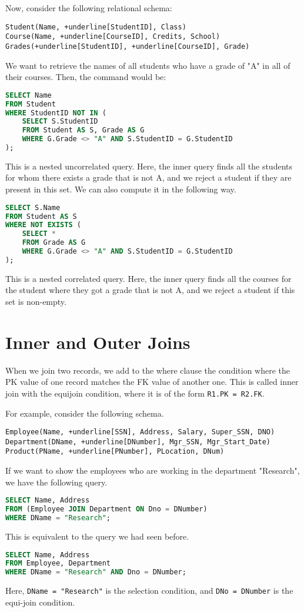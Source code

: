\documentclass[a4paper, openany]{memoir}
\begin{document}
Now, consider the following relational schema:
\begin{Verbatim}[commandchars=+\[\]]
Student(Name, +underline[StudentID], Class)
Course(Name, +underline[CourseID], Credits, School)
Grades(+underline[StudentID], +underline[CourseID], Grade)
\end{Verbatim}
We want to retrieve the names of all students who have a grade of "A" in all of their courses. Then, the command would be:
\begin{lstlisting}[language=SQL]
SELECT Name
FROM Student
WHERE StudentID NOT IN (
    SELECT S.StudentID
    FROM Student AS S, Grade AS G
    WHERE G.Grade <> "A" AND S.StudentID = G.StudentID
);
\end{lstlisting}
This is a nested uncorrelated query. Here, the inner query finds all the students for whom there exists a grade that is not A, and we reject a student if they are present in this set. We can also compute it in the following way.
\begin{lstlisting}[language=SQL]
SELECT S.Name
FROM Student AS S
WHERE NOT EXISTS (
    SELECT *
    FROM Grade AS G
    WHERE G.Grade <> "A" AND S.StudentID = G.StudentID
);
\end{lstlisting}
This is a nested correlated query. Here, the inner query finds all the courses for the student where they got a grade that is not A, and we reject a student if this set is non-empty.

\newpage

\section{Inner and Outer Joins}
When we join two records, we add to the where clause the condition where the PK value of one record matches the FK value of another one. This is called inner join with the equijoin condition, where it is of the form \texttt{R1.PK = R2.FK}. 

For example, consider the following schema.
\begin{Verbatim}[commandchars=+\[\]]
Employee(Name, +underline[SSN], Address, Salary, Super_SSN, DNO)
Department(DName, +underline[DNumber], Mgr_SSN, Mgr_Start_Date)
Product(PName, +underline[PNumber], PLocation, DNum)
\end{Verbatim}
If we want to show the employees who are working in the department "Research", we have the following query.
\begin{lstlisting}[language=SQL]
SELECT Name, Address
FROM (Employee JOIN Department ON Dno = DNumber)
WHERE DName = "Research";
\end{lstlisting}
This is equivalent to the query we had seen before.
\begin{lstlisting}[language=SQL]
SELECT Name, Address
FROM Employee, Department
WHERE DName = "Research" AND Dno = DNumber;
\end{lstlisting}
Here, \texttt{DName = "Research"} is the selection condition, and \texttt{DNo = DNumber} is the equi-join condition.
\end{document}
